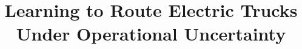 \documentclass[a4paper,fleqn]{cas-sc}
\begin{document}
\let\WriteBookmarks\relax
\def\floatpagepagefraction{1}
\def\textpagefraction{.001}

\title [mode = title]{Learning to Route Electric Trucks Under Operational Uncertainty}   





\end{document}
